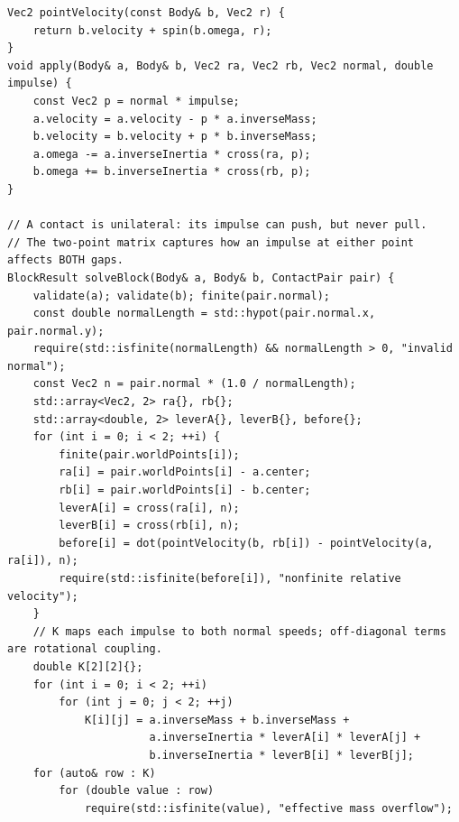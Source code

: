 \begin{verbatim}
Vec2 pointVelocity(const Body& b, Vec2 r) {
    return b.velocity + spin(b.omega, r);
}
void apply(Body& a, Body& b, Vec2 ra, Vec2 rb, Vec2 normal, double impulse) {
    const Vec2 p = normal * impulse;
    a.velocity = a.velocity - p * a.inverseMass;
    b.velocity = b.velocity + p * b.inverseMass;
    a.omega -= a.inverseInertia * cross(ra, p);
    b.omega += b.inverseInertia * cross(rb, p);
}

// A contact is unilateral: its impulse can push, but never pull.
// The two-point matrix captures how an impulse at either point affects BOTH gaps.
BlockResult solveBlock(Body& a, Body& b, ContactPair pair) {
    validate(a); validate(b); finite(pair.normal);
    const double normalLength = std::hypot(pair.normal.x, pair.normal.y);
    require(std::isfinite(normalLength) && normalLength > 0, "invalid normal");
    const Vec2 n = pair.normal * (1.0 / normalLength);
    std::array<Vec2, 2> ra{}, rb{};
    std::array<double, 2> leverA{}, leverB{}, before{};
    for (int i = 0; i < 2; ++i) {
        finite(pair.worldPoints[i]);
        ra[i] = pair.worldPoints[i] - a.center;
        rb[i] = pair.worldPoints[i] - b.center;
        leverA[i] = cross(ra[i], n);
        leverB[i] = cross(rb[i], n);
        before[i] = dot(pointVelocity(b, rb[i]) - pointVelocity(a, ra[i]), n);
        require(std::isfinite(before[i]), "nonfinite relative velocity");
    }
    // K maps each impulse to both normal speeds; off-diagonal terms are rotational coupling.
    double K[2][2]{};
    for (int i = 0; i < 2; ++i)
        for (int j = 0; j < 2; ++j)
            K[i][j] = a.inverseMass + b.inverseMass +
                      a.inverseInertia * leverA[i] * leverA[j] +
                      b.inverseInertia * leverB[i] * leverB[j];
    for (auto& row : K)
        for (double value : row)
            require(std::isfinite(value), "effective mass overflow");


\end{verbatim}
